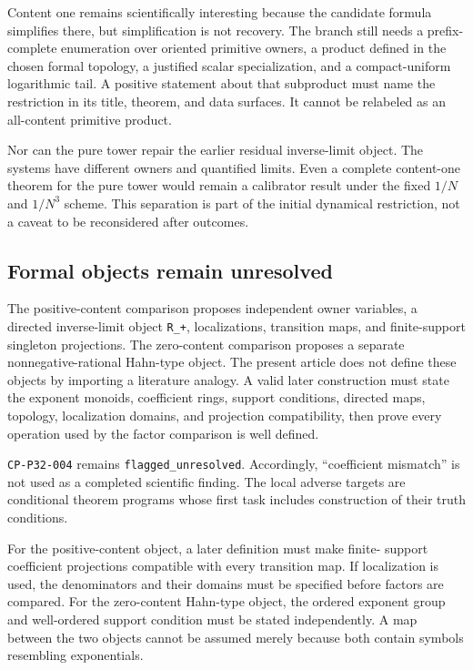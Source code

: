 \documentclass[11pt]{article}
\begin{document}
Content one remains scientifically interesting because the candidate
formula simplifies there, but simplification is not recovery. The
branch still needs a prefix-complete enumeration over oriented primitive
owners, a product defined in the chosen formal topology, a justified
scalar specialization, and a compact-uniform logarithmic tail. A
positive statement about that subproduct must name the restriction in
its title, theorem, and data surfaces. It cannot be relabeled as an
all-content primitive product.

Nor can the pure tower repair the earlier residual inverse-limit object.
The systems have different owners and quantified limits. Even a
complete content-one theorem for the pure tower would remain a
calibrator result under the fixed $1/N$ and $1/N^3$ scheme. This
separation is part of the initial dynamical restriction, not a caveat to
be reconsidered after outcomes.

\hypertarget{45-formal-objects-remain-unresolved}{%
\subsection{Formal objects remain
unresolved}\label{45-formal-objects-remain-unresolved}}

The positive-content comparison proposes independent owner variables, a
directed inverse-limit object \texttt{R\_+}, localizations, transition
maps, and finite-support singleton projections. The zero-content
comparison proposes a separate nonnegative-rational Hahn-type object.
The present article does not define these objects by importing a literature
analogy. A valid later construction must state the exponent monoids,
coefficient rings, support conditions, directed maps, topology,
localization domains, and projection compatibility, then prove every
operation used by the factor comparison is well defined.

\texttt{CP-P32-004} remains \texttt{flagged\_unresolved}. Accordingly,
``coefficient mismatch'' is not used as a completed scientific finding.
The local adverse targets are conditional theorem programs whose first
task includes construction of their truth conditions.

For the positive-content object, a later definition must make finite-
support coefficient projections compatible with every transition map.
If localization is used, the denominators and their domains must be
specified before factors are compared. For the zero-content Hahn-type
object, the ordered exponent group and well-ordered support condition
must be stated independently. A map between the two objects cannot be
assumed merely because both contain symbols resembling exponentials.
\end{document}
